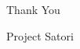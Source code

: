 \documentclass{beamer}
\begin{document}
\begin{frame}
  \centering
  \vspace*{2cm}
  {\Huge Thank You}
  \vspace{1cm}
  
  {\large Project Satori}
\end{frame}
\end{document}
